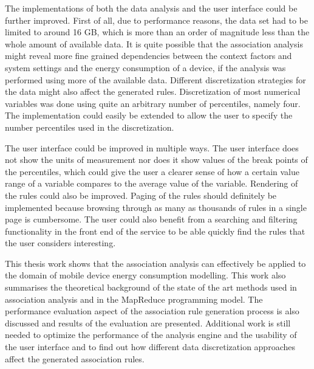 The implementations of both the data analysis and the user interface could be further improved. First of all, due to performance reasons, the data set had to be limited to around 16 GB, which is more than an order of magnitude less than the whole amount of available data. It is quite possible that the association analysis might reveal more fine grained dependencies between the context factors and system settings and the energy consumption of a device, if the analysis was performed using more of the available data. Different discretization strategies for the data might also affect the generated rules. Discretization of most numerical variables was done using quite an arbitrary number of percentiles, namely four. The implementation could easily be extended to allow the user to specify the number percentiles used in the discretization. 

The user interface could be improved in multiple ways. The user interface does not show the units of measurement nor does it show values of the break points of the percentiles, which could give the user a clearer sense of how a certain value range of a variable compares to the average value of the variable. Rendering of the rules could also be improved. Paging of the rules should definitely be implemented because browsing through as many as thousands of rules in a single page is cumbersome. The user could also benefit from a searching and filtering functionality in the front end of the service to be able quickly find the rules that the user considers interesting. 

This thesis work shows that the association analysis can effectively be applied to the domain of mobile device energy consumption modelling. This work also summarises the theoretical background of the state of the art methods used in association analysis and in the MapReduce programming model. The performance evaluation aspect of the association rule generation process is also discussed and results of the evaluation are presented. Additional work is still needed to optimize the performance of the analysis engine and the usability of the user interface and to find out how different data discretization approaches affect the generated association rules. 